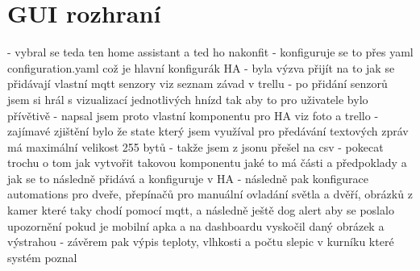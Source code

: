 \section{GUI rozhraní}\label{sec:tvorba-gui-rozhrani}
- vybral se teda ten home assistant a ted ho nakonfit\newline
- konfiguruje se to přes yaml configuration.yaml což je hlavní konfigurák HA\newline
- byla výzva přijít na to jak se přidávají vlastní mqtt senzory viz seznam závad v trellu\newline
- po přidání senzorů jsem si hrál s vizualizací jednotlivých hnízd tak aby to pro uživatele bylo přívětivě\newline
- napsal jsem proto vlastní komponentu pro HA viz foto a trello\newline
- zajímavé zjištění bylo že state který jsem využíval pro předávání textových zpráv má maximální velikost 255 bytů\newline
- takže jsem z jsonu přešel na csv\newline
- pokecat trochu o tom jak vytvořit takovou komponentu jaké to má části a předpoklady a jak se to následně přidává a konfiguruje v HA\newline
- následně pak konfigurace automations pro dveře, přepínačů pro manuální ovladání světla a dvěří, obrázků z kamer které taky chodí pomocí mqtt, a následně ještě dog alert aby se poslalo upozornění pokud je mobilní apka a na dashboardu vyskočil daný obrázek a výstrahou\newline
- závěrem pak výpis teploty, vlhkosti a počtu slepic v kurníku které systém poznal\newline